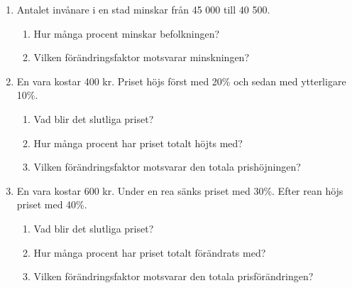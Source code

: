 \documentclass[a4paper,11pt]{article}
\begin{document}
\begin{enumerate}[label=\textbf{\arabic*.}]
    \item Antalet invånare i en stad minskar från 45 000 till 40 500.
    \begin{enumerate}[label=\alph*)]
        \item Hur många procent minskar befolkningen?
        \item Vilken förändringsfaktor motsvarar minskningen?
    \end{enumerate}
    
    \item En vara kostar 400 kr. Priset höjs först med 20\% och sedan med ytterligare 10\%.
    \begin{enumerate}[label=\alph*)]
        \item Vad blir det slutliga priset?
        \item Hur många procent har priset totalt höjts med?
        \item Vilken förändringsfaktor motsvarar den totala prishöjningen?
    \end{enumerate}
    
    \item En vara kostar 600 kr. Under en rea sänks priset med 30\%. Efter rean höjs priset med 40\%.
    \begin{enumerate}[label=\alph*)]
        \item Vad blir det slutliga priset?
        \item Hur många procent har priset totalt förändrats med?
        \item Vilken förändringsfaktor motsvarar den totala prisförändringen?
    \end{enumerate}
\end{enumerate}
\end{document}
